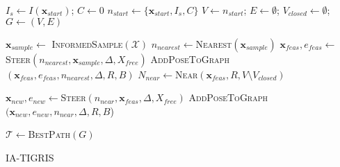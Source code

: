 \begin{algorithm}[t]
\SetInd{0.4em}{0.8em}
\DontPrintSemicolon
\small



{
    $I_s \leftarrow I(\mathbf{x}_{start})$; $C \leftarrow 0$\;
    $n_{start} \leftarrow \{\mathbf{x}_{start}, I_s, C\}$\;
    $V \leftarrow {n_{start}}$; $E \leftarrow \emptyset$; $V_{closed} \leftarrow \emptyset$; $G \leftarrow (V,E)$\;
}

{
    $\mathbf{x}_{sample} \leftarrow$ \textsc{InformedSample}$(\mathcal{X})$\;
    $n_{nearest} \leftarrow $\textsc{Nearest}$(\mathbf{x}_{sample})$\;
    $\mathbf{x}_{feas}, e_{feas} \leftarrow $\textsc{Steer}$(n_{nearest}, \mathbf{x}_{sample}, \Delta, X_{free})$\;
    \textsc{AddPoseToGraph}$(\mathbf{x}_{feas}, e_{feas}, n_{nearest}, \Delta, R, B)$\;
    $N_{near} \leftarrow $\textsc{Near}$(\mathbf{x}_{feas}, R, V \setminus V_{closed})$\;
    {
        {
        
            $\mathbf{x}_{new},e_{new}\leftarrow$\textsc{Steer}$(n_{near},\mathbf{x}_{feas},\!\Delta, X_{free})$\;
            {
                \textsc{AddPoseToGraph}$(\mathbf{x}_{new}, e_{new}, n_{near}, \Delta, R, B$)
            }
        }
    }
}

\Return $\mathcal{T} \leftarrow $\textsc{BestPath}$(G)$
\caption{\textsc{IA-TIGRIS} }
\label{alg:ours1}
\end{algorithm}



